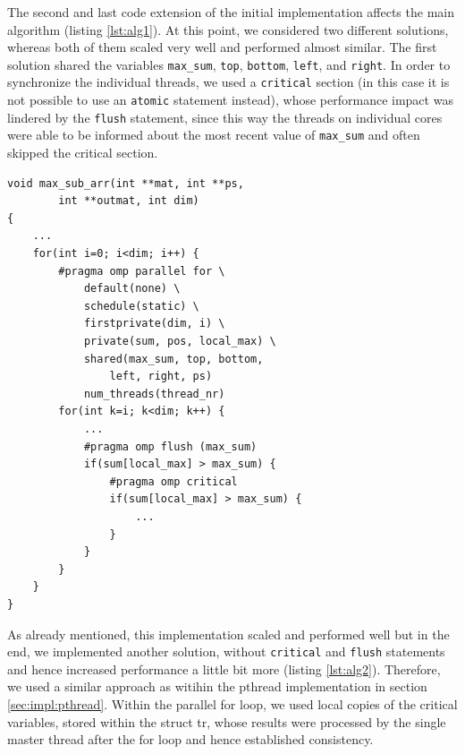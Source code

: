 \documentclass[conference]{IEEEtran}
\begin{document}
The second and last code extension of the initial implementation affects the main algorithm (listing \ref{lst:alg1}). At this point, we considered two different solutions, whereas both of them scaled very well and performed almost similar. The first solution shared the variables \texttt{max\_sum}, \texttt{top}, \texttt{bottom}, \texttt{left}, and \texttt{right}. In order to synchronize the individual threads, we used a \texttt{critical} section (in this case it is not possible to use an \texttt{atomic} statement instead), whose performance impact was lindered by the \texttt{flush} statement, since this way the threads on individual cores were able to be informed about the most recent value of \texttt{max\_sum} and often skipped the critical section. 


\begin{center}
   \begin{lstlisting}[captionpos=b, caption=OpenMP: Parallel Main Algorithm - First Approach, label=lst:alg1]  
void max_sub_arr(int **mat, int **ps, 
        int **outmat, int dim)                                                   
{                                                              
    ... 
    for(int i=0; i<dim; i++) {
        #pragma omp parallel for \
            default(none) \
            schedule(static) \
            firstprivate(dim, i) \
            private(sum, pos, local_max) \
            shared(max_sum, top, bottom, 
                left, right, ps)
            num_threads(thread_nr)
        for(int k=i; k<dim; k++) { 
            ...
            #pragma omp flush (max_sum)       
            if(sum[local_max] > max_sum) {    
                #pragma omp critical          
                if(sum[local_max] > max_sum) {
                    ...
                }
            }              
        }
    }
}
   \end{lstlisting}
\end{center}	

As already mentioned, this implementation scaled and performed well but in the end, we implemented another solution, without \texttt{critical} and \texttt{flush} statements and hence increased performance a little bit more (listing \ref{lst:alg2}). Therefore, we used a similar approach as witihin the pthread implementation in section \ref{sec:impl:pthread}. Within the parallel for loop, we used local copies of the critical variables, stored within the struct tr, whose results were processed by the single master thread after the for loop and hence established consistency. 
\end{document}
